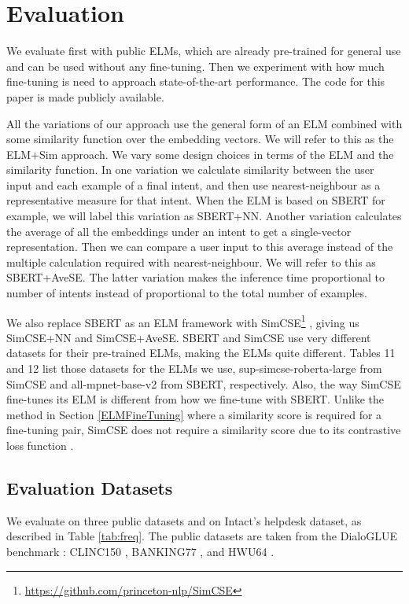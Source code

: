 \documentclass[sigconf, anonymous=true]{acmart}
\begin{document}
\section{Evaluation}
We evaluate first with public ELMs, which are already pre-trained for general use and can be used without any fine-tuning. Then we experiment with how much fine-tuning is need to approach state-of-the-art performance. The code for this paper is made publicly available. 

All the variations of our approach use the general form of an ELM combined with some similarity function over the embedding vectors. We will refer to this as the ELM+Sim approach. We vary some design choices in terms of the ELM and the similarity function. In one variation we calculate similarity between the user input and each example of a final intent, and then use nearest-neighbour as a representative measure for that intent. When the ELM is based on SBERT for example, we will label this variation as SBERT+NN. Another variation calculates the average of all the embeddings under an intent to get a single-vector representation. Then we can compare a user input to this average instead of the multiple calculation required with nearest-neighbour. We will refer to this as SBERT+AveSE. The latter variation makes the inference time proportional to number of intents instead of proportional to the total number of examples.  

We also replace SBERT as an ELM framework with SimCSE\footnote{\url{https://github.com/princeton-nlp/SimCSE}} \citep{gao2021simcse}, giving us SimCSE+NN and SimCSE+AveSE. SBERT and SimCSE use very different datasets for their pre-trained ELMs, making the ELMs quite different. Tables 11 and 12 list those datasets for the ELMs we use, sup-simcse-roberta-large from SimCSE and all-mpnet-base-v2 from SBERT, respectively. Also, the way SimCSE fine-tunes its ELM is different from how we fine-tune with SBERT. Unlike the method in Section \ref{ELMFineTuning} where a similarity score is required for a fine-tuning pair, SimCSE does not require a similarity score due to its contrastive loss function \citep{gao2021simcse}. 


\subsection{\textbf{Evaluation Datasets}} 
We evaluate on three public datasets and on Intact's helpdesk dataset, as described in Table \ref{tab:freq}. The public datasets are taken from the DialoGLUE benchmark \cite{MehriDialoGLUE2020}: CLINC150 \citep{larson-etal-2019-evaluation}, BANKING77 \citep{casanueva-etal-2020-efficient}, and HWU64 \citep{liu2019benchmarking}.  
\end{document}
